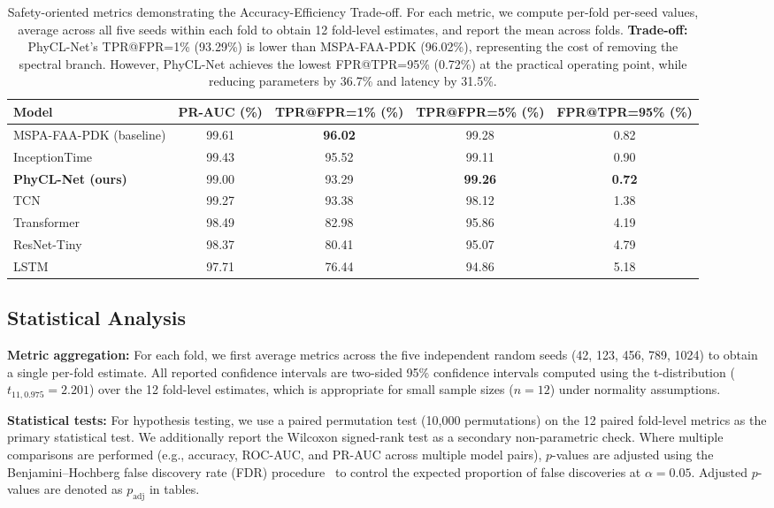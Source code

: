 \documentclass{article}
\begin{document}
\begin{table}[htbp]
\caption{Safety-oriented metrics demonstrating the Accuracy-Efficiency Trade-off. For each metric, we compute per-fold per-seed values, average across all five seeds within each fold to obtain 12 fold-level estimates, and report the mean across folds. \textbf{Trade-off:} PhyCL-Net's TPR@FPR=1\% (93.29\%) is lower than MSPA-FAA-PDK (96.02\%), representing the cost of removing the spectral branch. However, PhyCL-Net achieves the lowest FPR@TPR=95\% (0.72\%) at the practical operating point, while reducing parameters by 36.7\% and latency by 31.5\%.}
\label{tab:safety}
\centering
\small
\begin{tabular}{lcccc}
\toprule
Model & PR-AUC (\%) & TPR@FPR=1\% (\%) & TPR@FPR=5\% (\%) & FPR@TPR=95\% (\%) \\
\midrule
MSPA-FAA-PDK (baseline) & 99.61 & \textbf{96.02} & 99.28 & 0.82 \\
InceptionTime & 99.43 & 95.52 & 99.11 & 0.90 \\
\textbf{PhyCL-Net (ours)} & 99.00 & 93.29 & \textbf{99.26} & \textbf{0.72} \\
TCN & 99.27 & 93.38 & 98.12 & 1.38 \\
Transformer & 98.49 & 82.98 & 95.86 & 4.19 \\
ResNet-Tiny & 98.37 & 80.41 & 95.07 & 4.79 \\
LSTM & 97.71 & 76.44 & 94.86 & 5.18 \\
\bottomrule
\end{tabular}
\end{table}

\subsection{Statistical Analysis}

\textbf{Metric aggregation:} For each fold, we first average metrics across the five independent random seeds (42, 123, 456, 789, 1024) to obtain a single per-fold estimate. All reported confidence intervals are two-sided 95\% confidence intervals computed using the t-distribution ($t_{11, 0.975} = 2.201$) over the 12 fold-level estimates, which is appropriate for small sample sizes ($n=12$) under normality assumptions.

\textbf{Statistical tests:} For hypothesis testing, we use a paired permutation test (10,000 permutations) on the 12 paired fold-level metrics as the primary statistical test. We additionally report the Wilcoxon signed-rank test as a secondary non-parametric check. Where multiple comparisons are performed (e.g., accuracy, ROC-AUC, and PR-AUC across multiple model pairs), $p$-values are adjusted using the Benjamini--Hochberg false discovery rate (FDR) procedure~\cite{Benjamini1995FDR} to control the expected proportion of false discoveries at $\alpha = 0.05$. Adjusted $p$-values are denoted as $p_{\mathrm{adj}}$ in tables.
\end{document}

